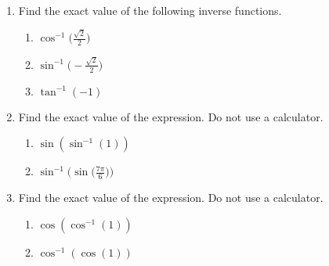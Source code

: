 


\begin{enumerate}
\item  Find the exact value of the following inverse functions.

\begin{enumerate}
\item $\displaystyle \cos^{-1}\Big(\frac{\sqrt{2}}{2}\Big)$\vfill
\item $\displaystyle \sin^{-1}\Big(-\frac{\sqrt{2}}{2}\Big)$\vfill
\item $\displaystyle \tan^{-1}(-1)$\vfill

\end{enumerate}
\newpage


\item  Find the exact value of the expression.  Do not use a calculator.

\begin{enumerate}
\item $\sin(\sin^{-1}(1))$\vfill
\item $\displaystyle \sin^{-1}\Big(\sin\Big(\frac{7\pi}{6}\Big)\Big)$\vfill
\end{enumerate}

\item  Find the exact value of the expression.  Do not use a calculator.

\begin{enumerate}
\item $\cos(\cos^{-1}(1))$\vfill
\item $\displaystyle \cos^{-1}(\cos(1))$\vfill
\end{enumerate}
\end{enumerate}



